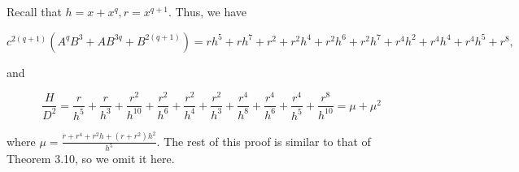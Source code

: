 \documentclass[10pt]{article}
\begin{document}
Recall that $h=x+x^{q}, r=x^{q+1}$. Thus, we have

$$
c^{2(q+1)}\left(A^{q} B^{3}+A B^{3 q}+B^{2(q+1)}\right)=r h^{5}+r h^{7}+r^{2}+r^{2} h^{4}+r^{2} h^{6}+r^{2} h^{7}+r^{4} h^{2}+r^{4} h^{4}+r^{4} h^{5}+r^{8},
$$

and

$$
\frac{H}{D^{2}}=\frac{r}{h^{5}}+\frac{r}{h^{3}}+\frac{r^{2}}{h^{10}}+\frac{r^{2}}{h^{6}}+\frac{r^{2}}{h^{4}}+\frac{r^{2}}{h^{3}}+\frac{r^{4}}{h^{8}}+\frac{r^{4}}{h^{6}}+\frac{r^{4}}{h^{5}}+\frac{r^{8}}{h^{10}}=\mu+\mu^{2}
$$

where $\mu=\frac{r+r^{4}+r^{2} h+\left(r+r^{2}\right) h^{2}}{h^{5}}$. The rest of this proof is similar to that of Theorem 3.10, so we omit it here.
\end{document}
